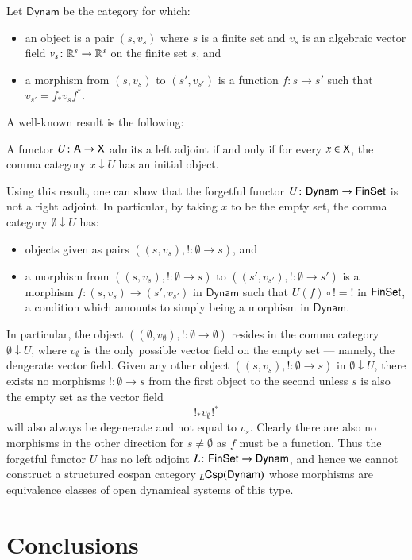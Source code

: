 \documentclass[reqno]{amsart}
\begin{document}
Let $\mathsf{Dynam}$ be the category for which:
\begin{itemize}
\item{an object is a pair $(s,v_s)$ where $s$ is a finite set and $v_s$ is an algebraic vector field $v_s \colon \mathbf{\mathbb R}^s \to \mathbf{\mathbb R}^s$ on the finite set $s$, and}
\item{a morphism from $(s,v_s)$ to $(s',v_{s'})$ is a function $f \colon s \to s'$ such that $v_{s'} = f_* v_s f^*$.}
\end{itemize}

A well-known result is the following:
\begin{lem}
A functor $U \colon \mathsf{A} \to \mathsf{X}$ admits a left adjoint if and only if for every $x \in \mathsf{X}$, the comma category $x \downarrow U$ has an initial object.
\end{lem}
Using this result, one can show that the forgetful functor $U \colon \mathsf{Dynam} \to \mathsf{Fin}\mathsf{Set}$ is not a right adjoint. In particular, by taking $x$ to be the empty set, the comma category $\emptyset \downarrow U$ has:
\begin{itemize}
\item{objects given as pairs $((s,v_s),! \colon \emptyset \to s)$, and}
\item{a morphism from $((s,v_s),! \colon \emptyset \to s)$ to $((s',v_{s'}),! \colon \emptyset \to s')$ is a morphism $f \colon (s,v_s) \to (s',v_{s'})$ in $\mathsf{Dynam}$ such that $U(f) \circ ! = !$ in $\mathsf{Fin}\mathsf{Set}$, a condition which amounts to simply being a morphism in $\mathsf{Dynam}$.}
\end{itemize}
In particular, the object $((\emptyset,v_\emptyset),! \colon \emptyset \to \emptyset)$ resides in the comma category $\emptyset \downarrow U$, where $v_\emptyset$ is the only possible vector field on the empty set --- namely, the dengerate vector field. Given any other object $((s,v_s),! \colon \emptyset \to s)$ in $\emptyset \downarrow U$, there exists no morphisms $! \colon \emptyset \to s$ from the first object to the second unless $s$ is also the empty set as the vector field $$!_* v_\emptyset !^*$$will also always be degenerate and not equal to $v_s$. Clearly there are also no morphisms in the other direction for $s \neq \emptyset$ as $f$ must be a function. Thus the forgetful functor $U$ has no left adjoint $L \colon \mathsf{Fin}\mathsf{Set} \to \mathsf{Dynam}$, and hence we cannot construct a structured cospan category ${_L \mathsf{Csp}(\mathsf{Dynam})}$ whose morphisms are equivalence classes of open dynamical systems of this type.

\section{Conclusions}\label{sec:conclusions}
\end{document}
